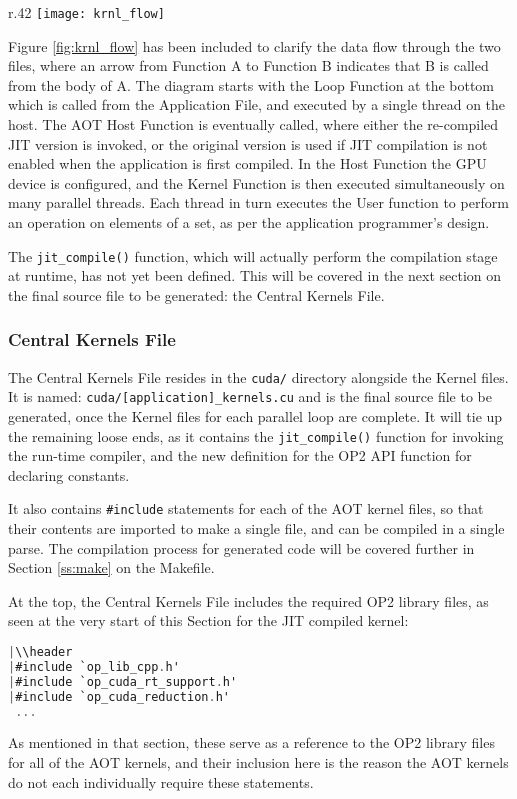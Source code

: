 \begin{wrapfigure}{r}{.42\textwidth}
  \centering
  \texttt{[image: krnl\_flow]}
  \caption{Kernel Flow}
  \label{fig:krnl_flow}
\end{wrapfigure}

Figure \ref{fig:krnl_flow} has been included to clarify the data flow through the two files, where an arrow from Function A to Function B indicates that B is called from the body of A. The diagram starts with the Loop Function at the bottom which is called from the Application File, and executed by a single thread on the host. The AOT Host Function is eventually called, where either the re-compiled JIT version is invoked, or the original version is used if JIT compilation is not enabled when the application is first compiled. In the Host Function the GPU device is configured, and the Kernel Function is then executed simultaneously on many parallel threads. Each thread in turn executes the User function to perform an operation on elements of a set, as per the application programmer's design.

The \verb|jit_compile()| function, which will actually perform the compilation stage at runtime, has not yet been defined. This will be covered in the next section on the final source file to be generated: the Central Kernels File.
\clearpage
\subsubsection{Central Kernels File}
\label{sss:mkf}
The Central Kernels File resides in the \verb|cuda/| directory alongside the Kernel files. It is named: \verb|cuda/[application]_kernels.cu| and is the final source file to be generated, once the Kernel files for each parallel loop are complete. It will tie up the remaining loose ends, as it contains the \verb|jit_compile()| function for invoking the run-time compiler, and the new definition for the OP2 API function for declaring constants.
\par It also contains \verb|#include| statements for each of the AOT kernel files, so that their contents are imported to make a single file, and can be compiled in a single parse. The compilation process for generated code will be covered further in Section \ref{ss:make} on the Makefile.
\par
At the top, the Central Kernels File includes the required OP2 library files, as seen at the very start of this Section for the JIT compiled kernel:
\begin{lstlisting}[backgroundcolor = \color{red!20}, language=C]
|\\header
|#include `op_lib_cpp.h'
|#include `op_cuda_rt_support.h'
|#include `op_cuda_reduction.h'
 ...
\end{lstlisting}
As mentioned in that section, these serve as a reference to the OP2 library files for all of the AOT kernels, and their inclusion here is the reason the AOT kernels do not each individually require these statements.

